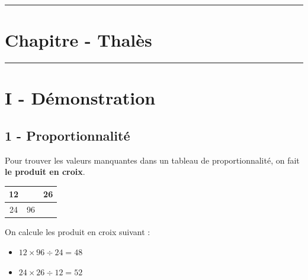 \documentclass[11pt]{article}
\newcommand{\horrule}[1]{\rule{\linewidth}{#1}} %
\begin{document}

\newtheorem{Definition}{Définition}
\newtheorem{Theorem}{Théorème}
\newtheorem{Proposition}{Propriété}

\renewcommand{\labelitemi}{$\bullet$}
\renewcommand{\labelitemii}{$\circ$}

\setlength{\columnseprule}{1pt}

\horrule{2px}
\section*{Chapitre - Thalès}
\horrule{2px}

\section*{I - Démonstration}

\subsection*{1 - Proportionnalité}

\begin{multicols}{2}

  Pour trouver les valeurs manquantes dans un tableau de proportionnalité, on fait \textbf{le produit en croix}.

  \begin{center}
    \begin{tabular}{|c|c|c|}
      \hline
      12 &  & 26 \\  \hline
      24 & 96 &  \\  \hline
    \end{tabular}
  \end{center}

  On calcule les produit en croix suivant :

  \begin{itemize}
    \item $12 \times 96 \div 24 = 48$
    \item $24 \times 26 \div 12 = 52$
  \end{itemize}

\end{multicols}
\end{document}
